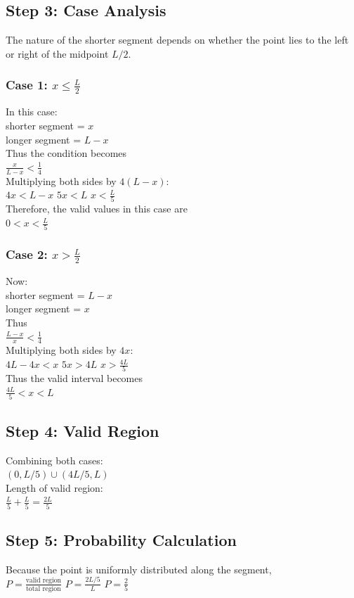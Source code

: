 \documentclass{article}
\begin{document}
\subsection{Step 3: Case Analysis}
The nature of the shorter segment depends on whether the point lies to the left or right of the midpoint $L/2$.

\subsubsection{Case 1: $x \le \frac{L}{2}$}
In this case: \\
shorter segment = $x$ \\
longer segment = $L-x$ \\
Thus the condition becomes \\
$\frac{x}{L-x} < \frac{1}{4}$ \\
Multiplying both sides by $4(L-x)$: \\
$4x < L-x$ \quad $5x < L$ \quad $x < \frac{L}{5}$ \\
Therefore, the valid values in this case are \\
$0 < x < \frac{L}{5}$

\subsubsection{Case 2: $x > \frac{L}{2}$}
Now: \\
shorter segment = $L-x$ \\
longer segment = $x$ \\
Thus \\
$\frac{L-x}{x} < \frac{1}{4}$ \\
Multiplying both sides by $4x$: \\
$4L - 4x < x$ \quad $5x > 4L$ \quad $x > \frac{4L}{5}$ \\
Thus the valid interval becomes \\
$\frac{4L}{5} < x < L$

\subsection{Step 4: Valid Region}
Combining both cases: \\
$(0, L/5) \cup (4L/5, L)$ \\
Length of valid region: \\
$\frac{L}{5} + \frac{L}{5} = \frac{2L}{5}$

\subsection{Step 5: Probability Calculation}
Because the point is uniformly distributed along the segment, \\
$P = \frac{\text{valid region}}{\text{total region}}$ \quad $P = \frac{2L/5}{L}$ \quad $P = \frac{2}{5}$
\end{document}
